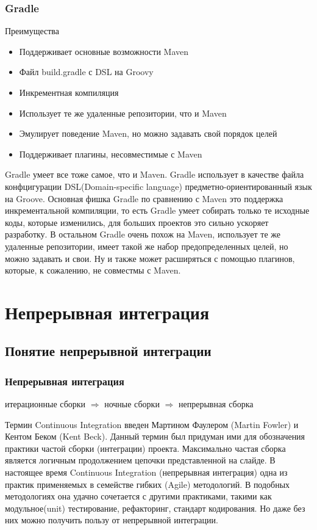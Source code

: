 \documentclass{../industrial-development}
\begin{document}
\begin{frame} \frametitle{Gradle}
	\begin{block}{Преимущества}
		\begin{itemize}
			\item Поддерживает основные возможности Maven
			\item Файл build.gradle с DSL на Groovy
			\item Инкрементная компиляция
			\item Использует те же удаленные репозитории, что
			и Maven
			\item Эмулирует поведение Maven, но можно
			задавать свой порядок целей
			\item Поддерживает плагины, несовместимые с
			Maven
		\end{itemize}
	\end{block}		
\end{frame}
\lecturenotes
Gradle умеет все тоже самое, что и Maven.
Gradle использует в качестве файла конфцигурации DSL(Domain-specific language) предметно-ориентированный язык на Groove.
Основная фишка Gradle по сравнению с Maven это поддержка инкрементальной компиляции, то есть Gradle умеет собирать только те исходные коды, которые изменились, для больших проектов это сильно ускоряет разработку.
В остальном Gradle очень похож на Maven, использует те же удаленные репозитории, имеет такой же набор предопределенных целей, но можно задавать и свои.
Ну и также может расширяться с помощью плагинов, которые, к сожалению, не совместмы с Maven.
~\cite{Yandex_Build_Automation}

\section {Непрерывная интеграция}
\subsection {Понятие непрерывной интеграции}

\begin{frame} \frametitle{Непрерывная интеграция}
		итерационные сборки $\Rightarrow$  ночные сборки $\Rightarrow$  непрерывная сборка
	\end{frame}
\lecturenotes
Термин Continuous Integration введен Мартином Фаулером (Martin Fowler) и Кентом Беком (Kent Beck). Данный термин был придуман ими для обозначения практики частой сборки (интеграции) проекта. Максимально частая сборка является логичным продолжением цепочки представленной на слайде.
В настоящее время Continuous Integration (непрерывная интеграция) одна из практик применяемых в семействе гибких (Agile) методологий. В подобных методологиях она удачно сочетается с другими практиками, такими как модульное(unit) тестирование, рефакторинг, стандарт кодирования. Но даже без них можно получить пользу от непрерывной интеграции.
~\cite{Custis_Continuous Integration}
\end{document}
